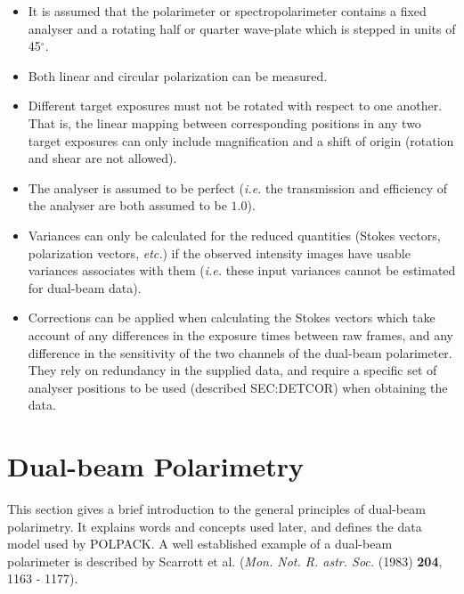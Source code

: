 \documentclass[twoside,11pt]{starlink}
\providecommand{\dgs}{\hbox{$^\circ$}}
\begin{document}
\begin{itemize}

\item It is assumed that the polarimeter or spectropolarimeter contains a
fixed analyser and a rotating half or quarter wave-plate which is stepped
in units of 45\dgs.

\item Both linear and circular polarization can be measured.

\item Different target exposures must not be rotated with respect to one
another. That is, the linear mapping between corresponding positions in any two target
exposures can only include magnification and a shift of origin (rotation
and shear are not allowed).

\item The analyser is assumed to be perfect (\emph{i.e.} the transmission and
efficiency of the analyser are both assumed to be $1.0$).

\item Variances can only be calculated for the reduced quantities (Stokes
vectors, polarization vectors, \emph{etc.}) if the observed intensity
images have usable variances associates with them (\emph{i.e.} these
input variances cannot be estimated for dual-beam data).

\item Corrections can be applied when calculating the Stokes vectors which
take account of any differences in the exposure times between raw frames,
and any difference in the sensitivity of the two channels of the
dual-beam polarimeter. They rely on redundancy in the supplied data, and
require a specific set of analyser positions to be used (described
 {SEC:DETCOR}) when obtaining the data.

\end{itemize}

\section{\label{SEC:DBPOL}Dual-beam Polarimetry}
This section gives a brief introduction to the general principles of
dual-beam polarimetry. It explains words and concepts used later, and
defines the data model used by POLPACK. A well established example of a
dual-beam polarimeter is described by Scarrott et al. (\emph{Mon. Not. R.
astr. Soc.} (1983) \textbf{204}, 1163 - 1177).
\end{document}
